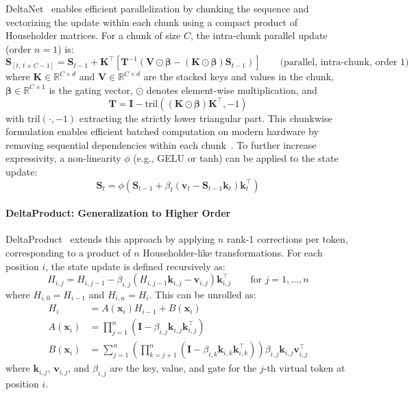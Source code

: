 \documentclass[10pt,a4paper]{article}
\begin{document}
DeltaNet~\cite{yang2024parallelizing} enables efficient parallelization by chunking the sequence and vectorizing the update within each chunk using a compact product of Householder matrices. For a chunk of size $C$, the intra-chunk parallel update (order $n=1$) is:
\begin{equation}
    \mathbf{S}_{[t,\,t+C-1]} = \mathbf{S}_{t-1} + \mathbf{K}^\top
    \left[ \mathbf{T}^{-1}
    \left( \mathbf{V} \odot \boldsymbol{\beta} - (\mathbf{K} \odot \boldsymbol{\beta}) \mathbf{S}_{t-1} \right) \right]
    \qquad \text{(parallel, intra-chunk, order 1)}
\end{equation}
where $\mathbf{K} \in \mathbb{R}^{C \times d}$ and $\mathbf{V} \in \mathbb{R}^{C \times d}$ are the stacked keys and values in the chunk, $\boldsymbol{\beta} \in \mathbb{R}^{C \times 1}$ is the gating vector, $\odot$ denotes element-wise multiplication, and
\begin{equation}
    \mathbf{T} = \mathbf{I} - \mathrm{tril}\left((\mathbf{K} \odot \boldsymbol{\beta}) \mathbf{K}^\top, -1\right)
\end{equation}
with $\mathrm{tril}(\cdot, -1)$ extracting the strictly lower triangular part. This chunkwise formulation enables efficient batched computation on modern hardware by removing sequential dependencies within each chunk~\cite{yang2024parallelizing, siems2025deltaproduct}. To further increase expressivity, a non-linearity $\phi$ (e.g., GELU or tanh) can be applied to the state update:
\begin{equation}
    \mathbf{S}_t = \phi(\mathbf{S}_{t-1} + \beta_t \left( \mathbf{v}_t - \mathbf{S}_{t-1} \mathbf{k}_t \right) \mathbf{k}_t^\top)
\end{equation}

\paragraph{DeltaProduct: Generalization to Higher Order}

DeltaProduct~\cite{siems2025deltaproduct} extends this approach by applying $n$ rank-1 corrections per token, corresponding to a product of $n$ Householder-like transformations. For each position $i$, the state update is defined recursively as:
\begin{equation}
    H_{i,j} = H_{i,j-1} - \beta_{i,j} (H_{i,j-1} \mathbf{k}_{i,j} - \mathbf{v}_{i,j}) \mathbf{k}_{i,j}^\top
    \qquad \text{for } j=1,\ldots,n
\end{equation}
where $H_{i,0} = H_{i-1}$ and $H_{i,n} = H_i$. This can be unrolled as:
\begin{align}
    H_i &= A(\mathbf{x}_i) H_{i-1} + B(\mathbf{x}_i) \\
    A(\mathbf{x}_i) &= \prod_{j=1}^n \left( \mathbf{I} - \beta_{i,j} \mathbf{k}_{i,j} \mathbf{k}_{i,j}^\top \right) \\
    B(\mathbf{x}_i) &= \sum_{j=1}^n \left( \prod_{k=j+1}^n \left( \mathbf{I} - \beta_{i,k} \mathbf{k}_{i,k} \mathbf{k}_{i,k}^\top \right) \right) \beta_{i,j} \mathbf{k}_{i,j} \mathbf{v}_{i,j}^\top
\end{align}
where $\mathbf{k}_{i,j}$, $\mathbf{v}_{i,j}$, and $\beta_{i,j}$ are the key, value, and gate for the $j$-th virtual token at position $i$. 
\end{document}
